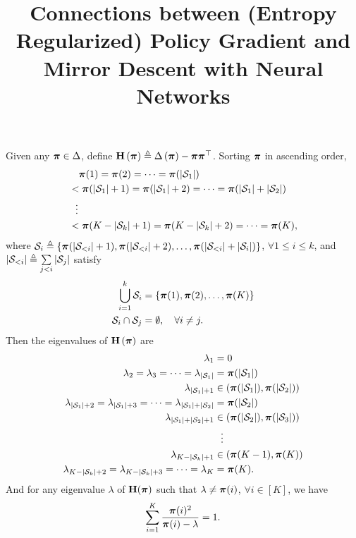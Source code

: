 \documentclass[10pt]{article}
\title{Connections between (Entropy Regularized) Policy Gradient and Mirror Descent with Neural Networks}
\author{}
\date{}
\begin{document}
\maketitle


\begin{lem}
Given any ${\boldsymbol{\pi}} \in \Delta$, define ${\mathbf{H}}\left( {\boldsymbol{\pi}} \right) \triangleq \Delta \left( {\boldsymbol{\pi}} \right) - {\boldsymbol{\pi}} {\boldsymbol{\pi}}^\top$. Sorting ${\boldsymbol{\pi}}$ in ascending order,
\begin{equation*}
\begin{split}
    &\quad {\boldsymbol{\pi}}(1) = {\boldsymbol{\pi}}(2) = \cdots = {\boldsymbol{\pi}}(|{\mathcal{S}}_1|) \\
    &< {\boldsymbol{\pi}}(|{\mathcal{S}}_1|+1) = {\boldsymbol{\pi}}(|{\mathcal{S}}_1|+2) = \cdots = {\boldsymbol{\pi}}(|{\mathcal{S}}_1| + |{\mathcal{S}}_2|) \\
    &\ \ \vdots \\
    &< {\boldsymbol{\pi}}(K - |{\mathcal{S}}_k| + 1) = {\boldsymbol{\pi}}(K - |{\mathcal{S}}_k| + 2) = \cdots = {\boldsymbol{\pi}}(K),
\end{split}
\end{equation*}
where ${\mathcal{S}}_i \triangleq \left\{ {\boldsymbol{\pi}}(|{\mathcal{S}}_{<i}| + 1), {\boldsymbol{\pi}}(|{\mathcal{S}}_{<i}| + 2), \dots,  {\boldsymbol{\pi}}(|{\mathcal{S}}_{<i}| + |{\mathcal{S}}_i|) \right\}$, $\forall 1 \le i \le k$, and $|{\mathcal{S}}_{<i}| \triangleq \sum\limits_{j < i}{|{\mathcal{S}}_j|}$ satisfy \begin{equation*}
\begin{split}
    \bigcup_{i=1}^{k}{{\mathcal{S}}_i} &= \left\{ {\boldsymbol{\pi}}(1), {\boldsymbol{\pi}}(2), \dots, {\boldsymbol{\pi}}(K) \right\} \\
    {\mathcal{S}}_i \cap {\mathcal{S}}_j &= \emptyset, \quad \forall i \not= j.
\end{split}    
\end{equation*}
Then the eigenvalues of ${\mathbf{H}}\left( {\boldsymbol{\pi}} \right)$ are
\begin{equation*}
\begin{split}
    \lambda_{1} &= 0 \\
    \lambda_{2} = \lambda_{3} = \cdots = \lambda_{|{\mathcal{S}}_1|} &= {\boldsymbol{\pi}}(|{\mathcal{S}}_1|) \\
    \lambda_{|{\mathcal{S}}_1| + 1 } &\in \left( {\boldsymbol{\pi}}(|{\mathcal{S}}_1|), {\boldsymbol{\pi}}(|{\mathcal{S}}_2|) \right) \\
    \lambda_{|{\mathcal{S}}_1| + 2} = \lambda_{|{\mathcal{S}}_1| + 3} = \cdots = \lambda_{|{\mathcal{S}}_1| + |{\mathcal{S}}_2|} &= {\boldsymbol{\pi}}(|{\mathcal{S}}_2|) \\
    \lambda_{|{\mathcal{S}}_1| + |{\mathcal{S}}_2| + 1 } &\in \left( {\boldsymbol{\pi}}(|{\mathcal{S}}_2|), {\boldsymbol{\pi}}(|{\mathcal{S}}_3|) \right) \\
    &\ \ \vdots \\
    \lambda_{K - |{\mathcal{S}}_k| +1} &\in \left( {\boldsymbol{\pi}}(K-1), {\boldsymbol{\pi}}(K) \right) \\
    \lambda_{K - |{\mathcal{S}}_k| + 2} = \lambda_{K - |{\mathcal{S}}_k| + 3} = \cdots = \lambda_{K} &= {\boldsymbol{\pi}}(K).
\end{split}
\end{equation*}
And for any eigenvalue $\lambda$ of ${\mathbf{H}}({\boldsymbol{\pi}})$ such that $\lambda \not= {\boldsymbol{\pi}}(i)$, $\forall i \in [K]$, we have
\begin{equation*}
    \sum\limits_{i=1}^{K}{\frac{{\boldsymbol{\pi}}(i)^2}{{\boldsymbol{\pi}}(i) - \lambda}} = 1.
\end{equation*}
\end{lem}
\end{document}
